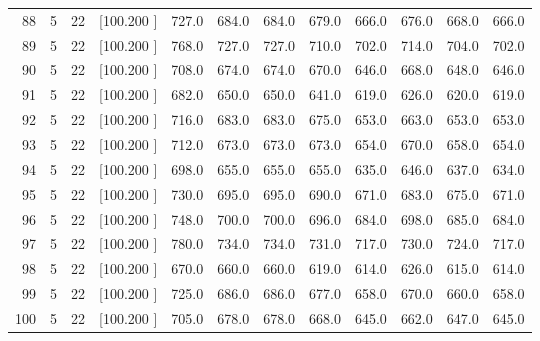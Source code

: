 \documentclass[12pt,a4paper]{article}
\begin{document}
\begin{center}
{\begin{tabular}{r r r r r r r r r r r r}
  88&  5& 22&[100.200   ]&   727.0&   684.0&   684.0&   679.0&   666.0&   676.0&   668.0&   666.0\\[-0.02in]
  89&  5& 22&[100.200   ]&   768.0&   727.0&   727.0&   710.0&   702.0&   714.0&   704.0&   702.0\\[-0.02in]
  90&  5& 22&[100.200   ]&   708.0&   674.0&   674.0&   670.0&   646.0&   668.0&   648.0&   646.0\\[-0.02in]
  91&  5& 22&[100.200   ]&   682.0&   650.0&   650.0&   641.0&   619.0&   626.0&   620.0&   619.0\\[-0.02in]
  92&  5& 22&[100.200   ]&   716.0&   683.0&   683.0&   675.0&   653.0&   663.0&   653.0&   653.0\\[-0.02in]
  93&  5& 22&[100.200   ]&   712.0&   673.0&   673.0&   673.0&   654.0&   670.0&   658.0&   654.0\\[-0.02in]
  94&  5& 22&[100.200   ]&   698.0&   655.0&   655.0&   655.0&   635.0&   646.0&   637.0&   634.0\\[-0.02in]
  95&  5& 22&[100.200   ]&   730.0&   695.0&   695.0&   690.0&   671.0&   683.0&   675.0&   671.0\\[-0.02in]
  96&  5& 22&[100.200   ]&   748.0&   700.0&   700.0&   696.0&   684.0&   698.0&   685.0&   684.0\\[-0.02in]
  97&  5& 22&[100.200   ]&   780.0&   734.0&   734.0&   731.0&   717.0&   730.0&   724.0&   717.0\\[-0.02in]
  98&  5& 22&[100.200   ]&   670.0&   660.0&   660.0&   619.0&   614.0&   626.0&   615.0&   614.0\\[-0.02in]
  99&  5& 22&[100.200   ]&   725.0&   686.0&   686.0&   677.0&   658.0&   670.0&   660.0&   658.0\\[-0.02in]
 100&  5& 22&[100.200   ]&   705.0&   678.0&   678.0&   668.0&   645.0&   662.0&   647.0&   645.0\\[-0.02in]

\hline
\end{tabular}}
\end{center}
\end{document}
